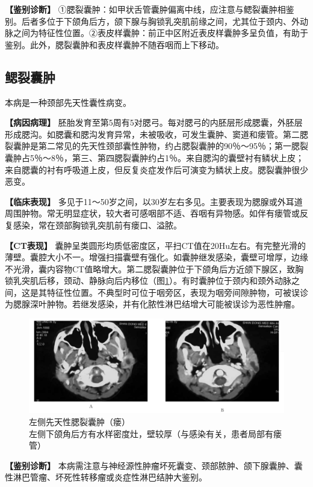 \textbf{【鉴别诊断】}
①腮裂囊肿：如甲状舌管囊肿偏离中线，应注意与鳃裂囊肿相鉴别。后者多位于下颌角后方，颌下腺与胸锁乳突肌前缘之间，尤其位于颈内、外动脉之间为特征性位置。②表皮样囊肿：前正中区附近表皮样囊肿多呈负值，有助于鉴别。此外，腮裂囊肿和表皮样囊肿不随吞咽而上下移动。

\subsection{鳃裂囊肿}

本病是一种颈部先天性囊性病变。

\textbf{【病因病理】}
胚胎发育至第5周有5对腮弓。每对腮弓的内胚层形成腮囊，外胚层形成腮沟。如腮囊和腮沟发育异常，未被吸收，可发生囊肿、窦道和瘘管。第二腮裂囊肿是第二常见的先天性颈部囊性肿物，约占腮裂囊肿的90％～95％；第一腮裂囊肿占5％～8％，第三、第四腮裂囊肿约占1％。来自腮沟的囊壁衬有鳞状上皮；来自腮囊的衬有呼吸道上皮，但反复炎症发作后可演变为鳞状上皮。腮裂囊肿很少恶变。

\textbf{【临床表现】}
多见于11～50岁之间，以30岁左右多见。主要表现为腮腺或外耳道周围肿物。常无明显症状，较大者可感咽部不适、吞咽有异物感。如伴有瘘管或反复感染，常在颈部胸锁乳突肌前有瘘口、溢脓。

\textbf{【CT表现】}
囊肿呈类圆形均质低密度区，平扫CT值在20Hu左右。有完整光滑的薄壁。囊腔大小不一。增强扫描囊壁有强化。如囊肿继发感染，囊壁可增厚，边缘不光滑，囊内容物CT值略增大。第二腮裂囊肿位于下颌角后方近颌下腺区，致胸锁乳突肌后移，颈动、静脉向后内移位（图\ref{fig8-3}）。有时囊肿位于颈内和颈外动脉之间，这是其特征性位置。不典型时可位于咽旁区，表现为咽旁间隙肿物，可被误诊为腮腺深叶肿物。若继发感染，并有化脓性淋巴结增大可能被误诊为恶性肿瘤。

\begin{figure}[!htbp]
 \centering
 \includegraphics[width=.7\textwidth,height=\textheight,keepaspectratio]{./images/Image00169.jpg}
 \captionsetup{justification=centering}
 \caption{左侧先天性腮裂囊肿（瘘）\\{\small 左侧下颌角后方有水样密度灶，壁较厚（与感染有关，患者局部有瘘管）}}
 \label{fig8-3}
  \end{figure} 

\textbf{【鉴别诊断】}
本病需注意与神经源性肿瘤坏死囊变、颈部脓肿、颌下腺囊肿、囊性淋巴管瘤、坏死性转移瘤或炎症性淋巴结肿大鉴别。

